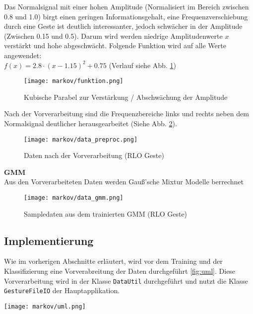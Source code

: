 Das Normalsignal mit einer hohen Amplitude (Normalisiert im Bereich zwischen 0.8 und 1.0) birgt einen geringen Informationsgehalt, 
eine Frequenzverschiebung durch eine Geste ist deutlich interessanter, jedoch schwächer in der Amplitude (Zwischen 0.15 und 0.5).
Darum wird werden niedrige Amplitudenwerte \( x \) verstärkt und hohe abgeschwächt. Folgende Funktion wird auf alle Werte angewendet: \\
\( f(x) = 2.8 \cdot ( x - 1.15 )^2 + 0.75 \) (Verlauf siehe Abb. \ref{fig:funktion})
\begin{figure}[htbp] \centering
    \texttt{[image: markov/funktion.png]}
    \caption{Kubische Parabel zur Verstärkung / Abschwächung der Amplitude}
    \label{fig:funktion}
\end{figure}

Nach der Vorverarbeitung sind die Frequenzbereiche links und rechts neben dem Normalsignal deutlicher herausgearbeitet (Siehe Abb. \ref{fig:data_preproc}).  

\begin{figure}[htbp] \centering
    \texttt{[image: markov/data\_preproc.png]}
    \caption{Daten nach der Vorverarbeitung (\acl{RLO} Geste)}
    \label{fig:data_preproc}
\end{figure}

\textbf{\acl{GMM}} \\
Aus den Vorverarbeiteten Daten werden Gauß’sche Mixtur Modelle berrechnet

\begin{figure}[htbp] \centering
    \texttt{[image: markov/data\_gmm.png]}
    \caption{Sampledaten aus dem trainierten \acl{GMM} (\acl{RLO} Geste)}
    \label{fig:data_gmm}
\end{figure}

\subsection{Implementierung}  \label{sec:impl}
Wie im vorherigen Abschnitte erläutert, wird vor dem Training und der Klassifizierung eine Vorverabreitung der Daten durchgeführt \ref{fig:uml}.
Diese Vorverarbeitung wird in der Klasse \texttt{DataUtil} durchgeführt und nutzt die Klasse \texttt{GestureFileIO} der Hauptapplikation.

\begin{figure*}[htbp] \centering
    \texttt{[image: markov/uml.png]}
    \caption{Klassendiagram und Abhängigkeiten des \acl{HMM} Klassifikators}
    \label{fig:uml}
\end{figure*}

